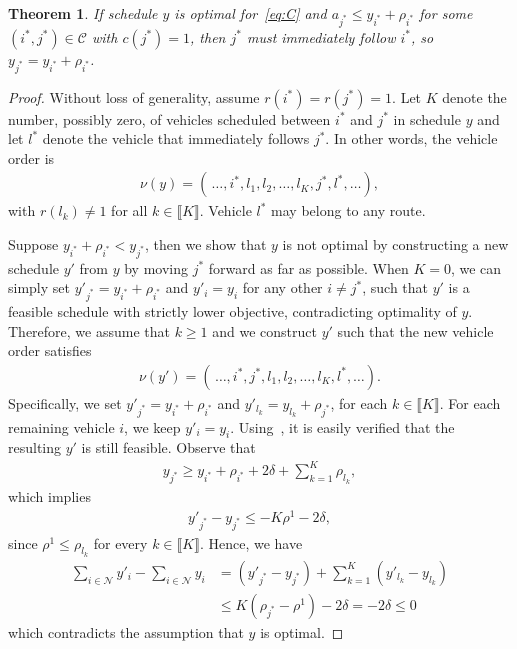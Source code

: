 \documentclass{article}
\theoremstyle{definition}
\theoremstyle{plain}
\newtheorem{theorem}{Theorem}
\begin{document}
\begin{theorem}
  If schedule $y$ is optimal for~\eqref{eq:C} and
  $a_{j^*} \leq y_{i^*} + \rho_{i^*}$ for some $(i^*, j^*) \in \mathcal{C}$ with
  $c(j^*) = 1$, then $j^*$ must immediately follow $i^*$, so
  $y_{j^*} = y_{i^*} + \rho_{i^*}$.
\end{theorem}
\begin{proof}
  Without loss of generality, assume $r(i^*) = r(j^*) = 1$.
  Let $K$ denote the number, possibly zero, of vehicles scheduled between $i^*$
  and $j^*$ in schedule $y$ and let $l^*$ denote the vehicle that immediately
  follows $j^*$. In other words, the vehicle order is
  \begin{align*}
    \nu(y) = (\, \dots , i^*, l_1, l_2, \dots, l_K, j^*, l^*, \dots) ,
  \end{align*}
  with $r(l_k) \neq 1$ for all $k \in \llbracket K \rrbracket$. Vehicle $l^*$
  may belong to any route.
  
  Suppose $y_{i^*} + \rho_{i^*} < y_{j^*}$, then we show that $y$ is not optimal by
  constructing a new schedule $y'$ from $y$ by moving $j^*$ forward as far as
  possible.
  When $K=0$, we can simply set $y'_{j^*} = y_{i^*} + \rho_{i^*}$ and
  $y'_i = y_i$ for any other $i \neq j^*$, such that $y'$ is a feasible schedule
  with strictly lower objective, contradicting optimality of $y$.
  Therefore, we assume that $k \geq 1$ and we construct $y'$ such that the new
  vehicle order satisfies
  \begin{align*}
    \nu(y') = (\, \dots , i^*, j^*, l_1, l_2, \dots, l_K, l^*, \dots) .
  \end{align*}
  Specifically, we set $y'_{j^*} = y_{i^*} + \rho_{i^*}$ and
  $y'_{l_k} = y_{l_k} + \rho_{j^*}$, for each $k \in \llbracket K \rrbracket$. For
  each remaining vehicle $i$, we keep $y'_i = y_i$.
  Using~, it is easily verified that the resulting
  $y'$ is still feasible.
  Observe that 
  \begin{align*}
    y_{j^*} \geq y_{i^*} + \rho_{i^*} + 2\delta + \sum_{k=1}^K \rho_{l_k},
  \end{align*}
  which implies
  \begin{align*}
    y'_{j^*} - y_{j^*} \leq - K \rho^1 - 2\delta ,
  \end{align*}
  since $\rho^1 \leq \rho_{l_k}$ for every $k \in \llbracket K \rrbracket$.
  Hence, we have
  \begin{align*}
    \sum_{i \in \mathcal{N}} y'_i - \sum_{i \in \mathcal{N}} y_i &= \left(y'_{j^*} - y_{j^*}\right) + \sum_{k=1}^K \left(y'_{l_k} - y_{l_k}\right) \\
    &\leq K (\rho_{j^*} - \rho^1) - 2\delta  = -2\delta
    \leq 0
  \end{align*}
  which contradicts the assumption that $y$ is optimal.
  \end{proof}

  
\end{document}
